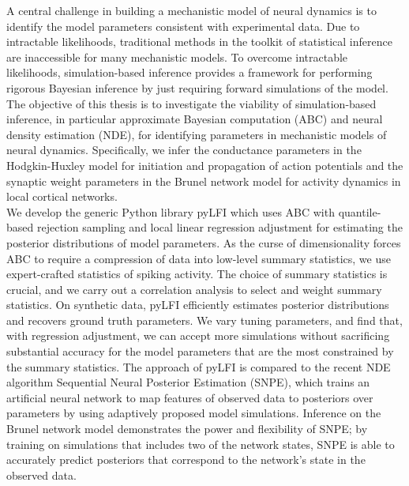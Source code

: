 A central challenge in building a mechanistic model of neural dynamics is to identify the model parameters consistent with experimental data. Due to intractable likelihoods, traditional methods in the toolkit of statistical inference are inaccessible for many mechanistic models. To overcome intractable likelihoods, simulation-based inference provides a framework for performing rigorous Bayesian inference by just requiring forward simulations of the model. The objective of this thesis is to investigate the viability of simulation-based inference, in particular approximate Bayesian computation (ABC) and neural density estimation (NDE), for identifying parameters in mechanistic models of neural dynamics. Specifically, we infer the conductance parameters in the Hodgkin-Huxley model for initiation and propagation of action potentials and the synaptic weight parameters in the Brunel network model for activity dynamics in local cortical networks. 
\\
\indent We develop the generic Python library pyLFI which uses ABC with quantile-based rejection sampling and local linear regression adjustment for estimating the posterior distributions of model parameters. As the curse of dimensionality forces ABC to require a compression of data into low-level summary statistics, we use expert-crafted statistics of spiking activity. The choice of summary statistics is crucial, and we carry out a correlation analysis to select and weight summary statistics. On synthetic data, pyLFI efficiently estimates posterior distributions and recovers ground truth parameters. We vary tuning parameters, and find that, with regression adjustment, we can accept more simulations without sacrificing substantial accuracy for the model parameters that are the most constrained by the summary statistics. %
The approach of pyLFI is compared to the recent NDE algorithm Sequential Neural Posterior Estimation (SNPE), which trains an artificial neural network to map features of observed data to posteriors over parameters by using adaptively proposed model simulations. Inference on the Brunel network model demonstrates the power and flexibility of SNPE; by training on simulations that includes two of the network states, SNPE is able to accurately predict posteriors that correspond to the network's state in the observed data.
